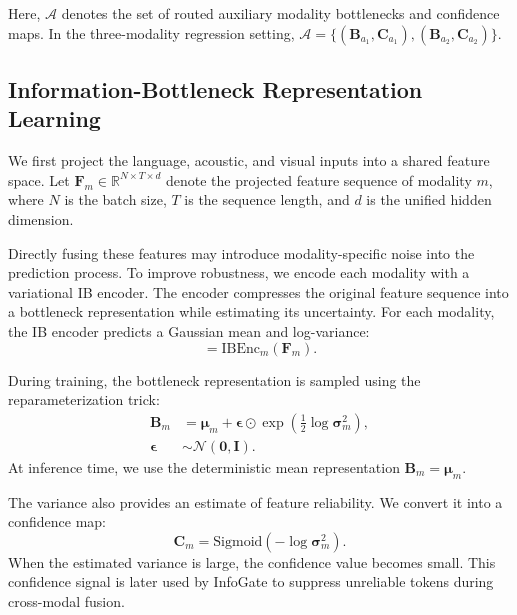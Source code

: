 \documentclass[11pt]{article}
\begin{document}
Here, $\mathcal{A}$ denotes the set of routed auxiliary modality bottlenecks
and confidence maps. In the three-modality regression setting,
$\mathcal{A}=\{(\mathbf{B}_{a_1},\mathbf{C}_{a_1}),
(\mathbf{B}_{a_2},\mathbf{C}_{a_2})\}$.

\subsection{Information-Bottleneck Representation Learning}
\label{sec:method-ibenc}

We first project the language, acoustic, and visual inputs into a shared
feature space. Let
$\mathbf{F}_m \in \mathbb{R}^{N \times T \times d}$ denote the projected
feature sequence of modality $m$, where $N$ is the batch size, $T$ is the
sequence length, and $d$ is the unified hidden dimension.

Directly fusing these features may introduce modality-specific noise into the
prediction process. To improve robustness, we encode each modality with a
variational IB encoder. The encoder compresses the original feature sequence
into a bottleneck representation while estimating its uncertainty. For each
modality, the IB encoder predicts a Gaussian mean and log-variance:
\begin{equation}
[\boldsymbol{\mu}_m;\log\boldsymbol{\sigma}_m^2]
=
\mathrm{IBEnc}_m(\mathbf{F}_m).
\end{equation}

During training, the bottleneck representation is sampled using the
reparameterization trick:
\begin{equation}
\begin{aligned}
\mathbf{B}_m
&=
\boldsymbol{\mu}_m
+
\boldsymbol{\epsilon}
\odot
\exp\!\left(\tfrac{1}{2}\log\boldsymbol{\sigma}_m^2\right), \\
\boldsymbol{\epsilon}
&\sim \mathcal{N}(\mathbf{0},\mathbf{I}).
\end{aligned}
\end{equation}
At inference time, we use the deterministic mean representation
$\mathbf{B}_m=\boldsymbol{\mu}_m$.

The variance also provides an estimate of feature reliability. We convert it
into a confidence map:
\begin{equation}
\mathbf{C}_m =
\mathrm{Sigmoid}(-\log\boldsymbol{\sigma}_m^2).
\end{equation}
When the estimated variance is large, the confidence value becomes small.
This confidence signal is later used by InfoGate to suppress unreliable tokens
during cross-modal fusion.
\end{document}
